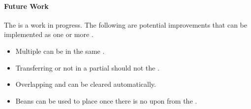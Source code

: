 \documentclass[class=article, crop=false]{standalone}
\begin{document}
\paragraph{Future Work}

The  is a work in progress. The following are potential improvements that can be implemented as one or more .

\begin{itemize}
    \item Multiple  can be  in the same .
    \item Transferring or   not  in a partial  should not  the .
    \item Overlapping  and  can be cleared automatically. 
    \item {} Beans can be used to place  once there is no   upon  from the .
\end{itemize}
\end{document}
